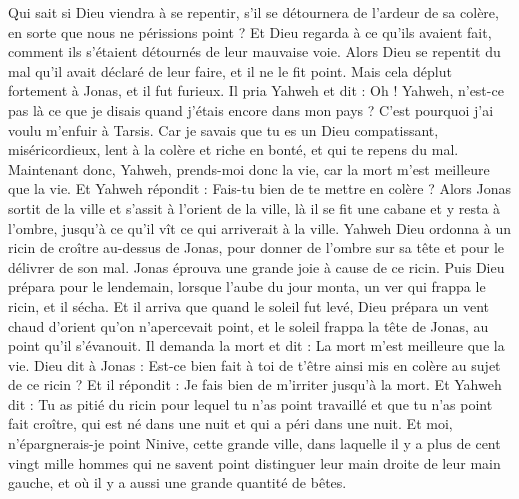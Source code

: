 \begin{multicols}{2}
Qui sait si Dieu viendra à se repentir, s'il se détournera de l'ardeur de sa colère, en sorte que nous ne périssions point ?
Et Dieu regarda à ce qu'ils avaient fait, comment ils s'étaient détournés de leur mauvaise voie. Alors Dieu se repentit du mal qu'il avait déclaré de leur faire, et il ne le fit point.
\VerseOne{}Mais cela déplut fortement à Jonas, et il fut furieux.
Il pria Yahweh et dit : Oh ! Yahweh, n'est-ce pas là ce que je disais quand j'étais encore dans mon pays ? C'est pourquoi j'ai voulu m'enfuir à Tarsis. Car je savais que tu es un Dieu compatissant, miséricordieux, lent à la colère et riche en bonté, et qui te repens du mal.
Maintenant donc, Yahweh, prends-moi donc la vie, car la mort m'est meilleure que la vie.
Et Yahweh répondit : Fais-tu bien de te mettre en colère ?
Alors Jonas sortit de la ville et s'assit à l'orient de la ville, là il se fit une cabane et y resta à l'ombre, jusqu'à ce qu'il vît ce qui arriverait à la ville.
Yahweh Dieu ordonna à un ricin de croître au-dessus de Jonas, pour donner de l'ombre sur sa tête et pour le délivrer de son mal. Jonas éprouva une grande joie à cause de ce ricin.
Puis Dieu prépara pour le lendemain, lorsque l'aube du jour monta, un ver qui frappa le ricin, et il sécha.
Et il arriva que quand le soleil fut levé, Dieu prépara un vent chaud d'orient qu'on n'apercevait point, et le soleil frappa la tête de Jonas, au point qu'il s'évanouit. Il demanda la mort et dit : La mort m'est meilleure que la vie.
Dieu dit à Jonas : Est-ce bien fait à toi de t'être ainsi mis en colère au sujet de ce ricin ? Et il répondit : Je fais bien de m'irriter jusqu'à la mort.
Et Yahweh dit : Tu as pitié du ricin pour lequel tu n'as point travaillé et que tu n'as point fait croître, qui est né dans une nuit et qui a péri dans une nuit.
Et moi, n'épargnerais-je point Ninive, cette grande ville, dans laquelle il y a plus de cent vingt mille hommes qui ne savent point distinguer leur main droite de leur main gauche, et où il y a aussi une grande quantité de bêtes.
\PPE{}
\end{multicols}

